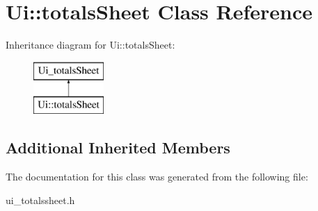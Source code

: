 \hypertarget{class_ui_1_1totals_sheet}{}\section{Ui\+:\+:totals\+Sheet Class Reference}
\label{class_ui_1_1totals_sheet}
Inheritance diagram for Ui\+:\+:totals\+Sheet\+:\begin{figure}[H]
\begin{center}
\leavevmode
\includegraphics[height=2.000000cm]{class_ui_1_1totals_sheet}
\end{center}
\end{figure}
\subsection*{Additional Inherited Members}


The documentation for this class was generated from the following file\+:\begin{DoxyCompactItemize}
\item 
ui\+\_\+totalssheet.\+h\end{DoxyCompactItemize}
